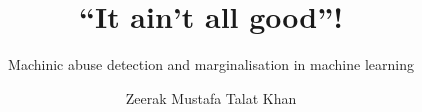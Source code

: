\title{``It ain't all good''!}

\subtitle{Machinic abuse detection and marginalisation in machine learning}

\author{Zeerak Mustafa Talat Khan}







     
